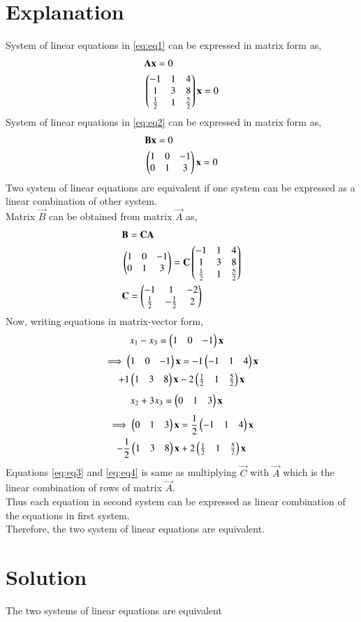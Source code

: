 \documentclass[journal,12pt,twocolumn]{IEEEtran}
\begin{document}
\section{Explanation}
System of linear equations in \eqref{eq:eq1} can be expressed in matrix form as,
\begin{align}
    &\mathbf{A}\mathbf{x}=0\\
    &\begin{pmatrix}-1&1&4\\1&3&8\\\frac{1}{2}&1&\frac{5}{2}\end{pmatrix}\mathbf{x}=0
\end{align}
System of linear equations in \eqref{eq:eq2} can be expressed in matrix form as,
\begin{align}
    &\mathbf{B}\mathbf{x}=0\\
    &\begin{pmatrix}1&0&-1\\0&1&3\end{pmatrix}\mathbf{x}=0
\end{align}
Two system of linear equations are equivalent if one system can be expressed as a linear combination of other system.\\
Matrix $\vec{B}$ can be obtained from matrix $\vec{A}$ as,
\begin{align}
&   \mathbf{B} = \mathbf{C}\mathbf{A}\\
&   \begin{pmatrix}1&0&-1\\0&1&3\end{pmatrix} = \mathbf{C}\begin{pmatrix}-1&1&4\\1&3&8\\\frac{1}{2}&1&\frac{5}{2}\end{pmatrix}\\
& \mathbf{C} = \begin{pmatrix}-1&1&-2\\\frac{1}{2}&-\frac{1}{2}&2\end{pmatrix}
\end{align}
Now, writing equations in matrix-vector form,
\begin{align*}
    &x_1-x_3=\begin{pmatrix}1&0&-1\end{pmatrix}\mathbf{x}
\end{align*}
\begin{multline}
\implies \begin{pmatrix}1&0&-1\end{pmatrix}\mathbf{x} = -1\begin{pmatrix}-1&1&4\end{pmatrix}\mathbf{x}\\+1\begin{pmatrix}1&3&8\end{pmatrix}\mathbf{x}-2\begin{pmatrix}\frac{1}{2}&1&\frac{5}{2}\end{pmatrix}\mathbf{x}\label{eq:eq3}
\end{multline}
\begin{align*}
    &x_2+3x_3=\begin{pmatrix}0&1&3\end{pmatrix}\mathbf{x}
\end{align*}
\begin{multline}
\implies \begin{pmatrix}0&1&3\end{pmatrix}\mathbf{x} = \frac{1}{2}\begin{pmatrix}-1&1&4\end{pmatrix}\mathbf{x}\\-\frac{1}{2}\begin{pmatrix}1&3&8\end{pmatrix}\mathbf{x}+2\begin{pmatrix}\frac{1}{2}&1&\frac{5}{2}\end{pmatrix}\mathbf{x}\label{eq:eq4}
\end{multline}
Equations \eqref{eq:eq3} and \eqref{eq:eq4} is same as multiplying $\vec{C}$ with $\vec{A}$ which is the linear combination of rows of matrix $\vec{A}$.\\
Thus each equation in second system can be expressed as linear combination of the equations in first system.\\
Therefore, the two system of linear equations are equivalent.
\section{Solution}
The two systems of linear equations are equivalent
\\
\end{document}
